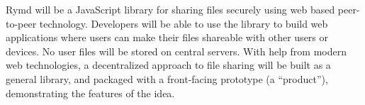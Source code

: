 Rymd will be a JavaScript library for sharing files securely using web based peer-to-peer technology. Developers will be able to use the library to build web applications where users can make their files shareable with other users or devices. No user files will be stored on central servers. With help from modern web technologies, a decentralized approach to file sharing will be built as a general library, and packaged with a front-facing prototype (a “product”), demonstrating the features of the idea.
